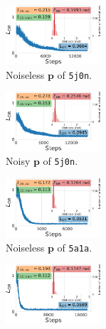 \begin{figure}[t]
    \centering
    \begin{subfigure}[b]{0.251\linewidth}
        \centering
        \includegraphics[height=2.2cm]{figures/5j0n_fullcvg_uniformS2_noise0_ar_aa.pdf}
        \caption{Noiseless $\mathbf{p}$ of \texttt{5j0n}.}%
        \label{fig:5j0n-noise0-orientation-recovery}
    \end{subfigure}
    \hfill
    \begin{subfigure}[b]{0.232\linewidth}
        \centering
        \includegraphics[height=2.2cm]{figures/5j0n_fullcvg_uniformS2_noise16_ar_aa.pdf}
        \caption{Noisy $\mathbf{p}$ of \texttt{5j0n}.}%
        \label{fig:5j0n-noise16-orientation-recovery}
    \end{subfigure}
    \hfill
    \begin{subfigure}[b]{0.251\linewidth}
        \centering
        \includegraphics[height=2.2cm]{figures/5a1a_quartercov_uniformS2_noise0_LAST_ar_aa.pdf}
        \caption{Noiseless $\mathbf{p}$ of \texttt{5a1a}.
        }%
        \label{fig:5a1a-noise0-orientation-recovery}
    \end{subfigure}
    \begin{subfigure}[b]{0.232\linewidth}
        \centering
        \includegraphics[height=2.2cm]{figures/5a1a_quartercov_uniformS2_noise16_LAST_ar_aa.pdf}

\end{subfigure}
\end{figure}
